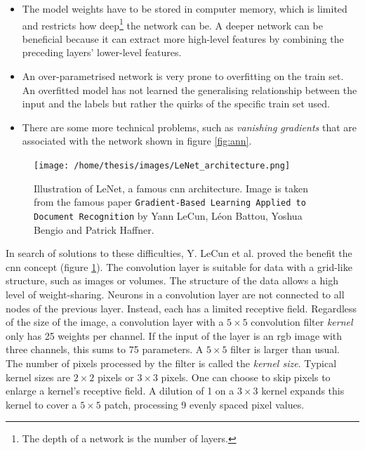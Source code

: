 \begin{itemize}
    \item The model weights have to be stored in computer memory, which is limited and restricts how deep\footnote{The depth of a network is the number of layers.} the network can be.
    A deeper network can be beneficial because it can extract more high-level features by combining the preceding layers' lower-level features. 
    \item An over-parametrised network is very prone to overfitting on the train set. 
    An overfitted model has not learned the generalising relationship between the input and the labels but rather the quirks of the specific train set used.
    \item There are some more technical problems, such as \textit{vanishing gradients} that are associated with the network shown in figure \ref{fig:ann}. 
\end{itemize}
\begin{figure}
    \centering
    \texttt{[image: /home/thesis/images/LeNet\_architecture.png]}
    \caption{
        Illustration of LeNet, a famous \Gls{cnn} architecture.
        Image is taken from the famous paper \texttt{Gradient-Based Learning Applied to Document Recognition} by Yann LeCun, Léon Battou, Yoshua Bengio and Patrick Haffner. \label{fig:LeNet}
        }
\end{figure}

\par{
    In search of solutions to these difficulties, Y. LeCun et al. proved the benefit the \Gls{cnn} concept (figure \ref{fig:LeNet}).
    The convolution layer is suitable for data with a grid-like structure, such as images or volumes.
    The structure of the data allows a high level of weight-sharing. 
    Neurons in a convolution layer are not connected to all nodes of the previous layer. Instead, each has a limited receptive field.
    Regardless of the size of the image, a convolution layer with a $5\times 5$ convolution filter \textit{kernel} only has 25 weights per channel.
    If the input of the layer is an \acrshort{rgb} image with three channels, this sums to 75 parameters. A $5\times 5$ filter is larger than usual.
    The number of pixels processed by the filter is called the \textit{kernel size}. 
    Typical kernel sizes are $2\times 2$ pixels or $3\times 3$ pixels.
    One can choose to skip pixels to enlarge a kernel's receptive field. 
    A dilution of 1 on a $3\times 3$ kernel expands this kernel to cover a $5\times 5$ patch, processing 9 evenly spaced pixel values. 
}

